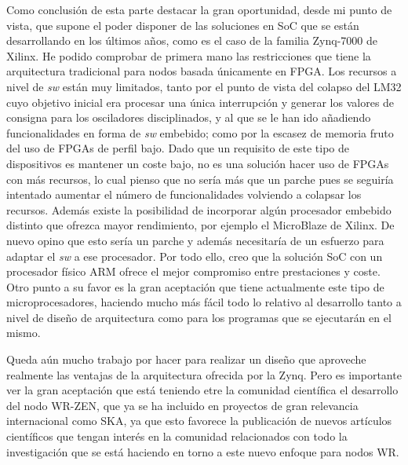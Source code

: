 Como conclusión de esta parte destacar la gran oportunidad, desde mi punto de 
vista, que supone el poder disponer de las soluciones en SoC que se están 
desarrollando en los últimos años, como es el caso de la familia Zynq-7000 de 
Xilinx. He podido comprobar de primera mano las restricciones que tiene la 
arquitectura tradicional para nodos basada únicamente en FPGA. Los recursos a 
nivel de \textit{sw} están muy limitados, tanto por el punto de vista del 
colapso del LM32 cuyo objetivo inicial era procesar una única interrupción y 
generar los valores de consigna para los osciladores disciplinados, y al que se 
le han ido añadiendo funcionalidades en forma de \textit{sw} embebido; como por 
la escasez de memoria fruto del uso de FPGAs de perfil bajo. Dado que un 
requisito de este tipo de dispositivos es mantener un coste bajo, no es una 
solución hacer uso de FPGAs con más recursos, lo cual pienso que no sería más 
que un parche pues se seguiría intentado aumentar el número de funcionalidades 
volviendo a colapsar los recursos. Además existe la posibilidad de incorporar 
algún procesador embebido distinto que ofrezca mayor rendimiento, por ejemplo 
el MicroBlaze de Xilinx. De nuevo opino que esto sería un parche y además 
necesitaría de un esfuerzo para adaptar el \textit{sw} a ese procesador. Por 
todo ello, creo que la solución SoC con un procesador físico ARM ofrece el 
mejor compromiso entre prestaciones y coste. Otro punto a su favor es la gran 
aceptación que tiene actualmente este tipo de microprocesadores, haciendo mucho 
más fácil todo lo relativo al desarrollo tanto a nivel de diseño de 
arquitectura como para los programas que se ejecutarán en el mismo.

Queda aún mucho trabajo por hacer para realizar un diseño que aproveche 
realmente las ventajas de la arquitectura ofrecida por la Zynq. Pero es 
importante ver la gran aceptación que está teniendo etre la comunidad 
científica el desarrollo del nodo WR-ZEN, que ya se ha incluido en proyectos de 
gran relevancia internacional como SKA, ya que esto favorece la publicación de 
nuevos artículos científicos que tengan interés en la comunidad relacionados 
con todo la investigación que se está haciendo en torno a este nuevo enfoque 
para nodos WR.

